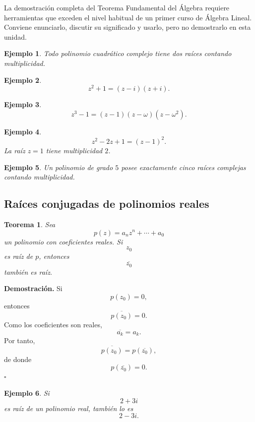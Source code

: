 \documentclass[12pt]{article}
\newtheorem{Ejem}{Ejemplo}
\newtheorem{Teo}{Teorema}
\begin{document}
La demostración completa del Teorema Fundamental del Álgebra requiere
herramientas que exceden el nivel habitual de un primer curso de Álgebra
Lineal. Conviene enunciarlo, discutir su significado y usarlo, pero no
demostrarlo en esta unidad.

\begin{Ejem}
Todo polinomio cuadrático complejo tiene dos raíces contando multiplicidad.

\end{Ejem}


\begin{Ejem}
\[
z^2+1
=
(z-i)(z+i).
\]

\end{Ejem}


\begin{Ejem}
\[
z^3-1
=
(z-1)(z-\omega)(z-\omega^2).
\]

\end{Ejem}


\begin{Ejem}
\[
z^2-2z+1
=
(z-1)^2.
\]
La raíz $z=1$ tiene multiplicidad $2$.

\end{Ejem}


\begin{Ejem}
Un polinomio de grado $5$ posee exactamente cinco raíces complejas contando multiplicidad.
\end{Ejem}


\subsection*{Raíces conjugadas de polinomios reales}

\begin{Teo}
Sea
\[
p(z)=a_nz^n+\cdots+a_0
\]
un polinomio con coeficientes reales. Si
\[
z_0
\]
es raíz de $p$, entonces
\[
\overline{z_0}
\]
también es raíz.
\end{Teo}



\textbf{Demostración.}
Si
\[
p(z_0)=0,
\]
entonces
\[
\overline{p(z_0)}=0.
\]
Como los coeficientes son reales,
\[
\overline{a_k}=a_k.
\]
Por tanto,
\[
\overline{p(z_0)}=p(\overline{z_0}),
\]
de donde
\[
p(\overline{z_0})=0.
\]
\hfill$\square$



\begin{Ejem}
Si
\[
2+3i
\]
es raíz de un polinomio real, también lo es
\[
2-3i.
\]

\end{Ejem}
\end{document}
